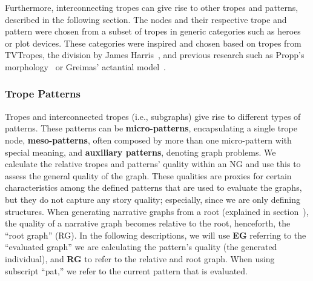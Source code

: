 Furthermore, interconnecting tropes can give rise to other tropes and patterns, described in the following section. The nodes and their respective trope and pattern were chosen from a subset of tropes in generic categories such as heroes or plot devices. These categories were inspired and chosen based on tropes from TVTropes, the division by James Harris~, and previous research such as Propp's morphology~ or Greimas' actantial model~. 

\subsubsection{Trope Patterns}


Tropes and interconnected tropes (i.e., subgraphs) give rise to different types of patterns. These patterns can be \textbf{micro-patterns}, encapsulating a single trope node, \textbf{meso-patterns}, often composed by more than one micro-pattern with special meaning, and \textbf{auxiliary patterns}, denoting graph problems. We calculate the relative tropes and patterns' quality within an NG and use this to assess the general quality of the graph. These qualities are proxies for certain characteristics among the defined patterns that are used to evaluate the graphs, but they do not capture any story quality; especially, since we are only defining structures. When generating narrative graphs from a root (explained in section~), the quality of a narrative graph becomes relative to the root, henceforth, the ``root graph'' (RG). In the following descriptions, we will use \textbf{EG} referring to the ``evaluated graph'' we are calculating the pattern's quality (the generated individual), and \textbf{RG} to refer to the relative and root graph. When using subscript ``pat,'' we refer to the current pattern that is evaluated. 


